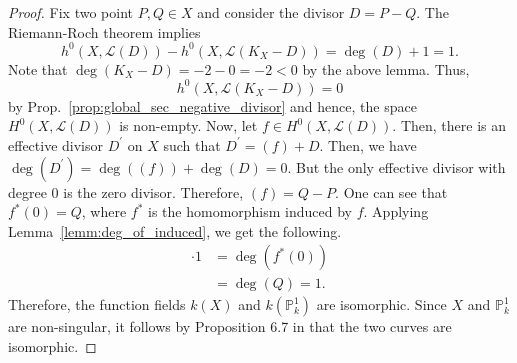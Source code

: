 \begin{proof}
  Fix two point $P,Q\in X$ and consider the divisor $D=P-Q$. The Riemann-Roch
  theorem implies
  \[
    h^{0}(X,\mathcal{L}(D))-h^{0}(X,\mathcal{L}(K_{X}-D))
    =\deg(D)+1=1.
  \]
  Note that $\deg(K_{X}-D)=-2-0=-2<0$ by the above lemma. Thus,
  \[
    h^{0}(X,\mathcal{L}(K_{X}-D))=0
  \]
  by Prop.~\ref{prop:global_sec_negative_divisor} and hence, the space
  $H^{0}(X,\mathcal{L}(D))$ is non-empty. Now, let
  $f\in H^{0}(X,\mathcal{L}(D))$. Then, there is an effective divisor
  $D^{\prime}$ on $X$ such that $D^{\prime}=(f)+D$. Then, we have
  $\deg\left(D^{\prime}\right)=\deg\left((f)\right)+\deg\left(D\right)=0$.
  But the only effective divisor with degree 0 is the zero divisor.
  Therefore, $(f)=Q-P$. One can see that $f^{\ast}(0)=Q$, where
  $f^{\ast}$ is the homomorphism induced by $f$. Applying
  Lemma~\ref{lemm:deg_of_induced}, we get the following.
  \begin{align*}
    [k(X):k(\mathbb{P}^{1})]\cdot 1
    &=\deg\left(f^{\ast}(0)\right) \\
    &=\deg(Q) = 1.
  \end{align*}
  Therefore, the function fields $k(X)$ and $k\left(\mathbb{P}^{1}_{k}\right)$
  are isomorphic. Since $X$ and $\mathbb{P}^{1}_{k}$ are non-singular,
  it follows by Proposition 6.7 in \cite{hartshorne} that the two curves
  are isomorphic.
\end{proof}
